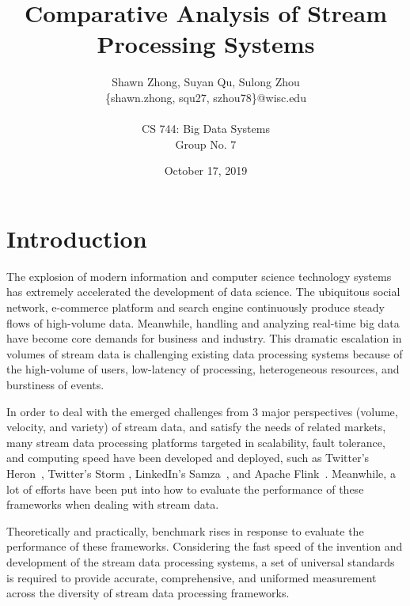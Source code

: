 \documentclass[pdftex,twocolumn,10pt,letterpaper]{article}
\begin{document}
\title{ Comparative Analysis of Stream Processing Systems }
\author{
    Shawn Zhong, Suyan Qu, Sulong Zhou \\
    \{shawn.zhong, squ27, szhou78\}@wisc.edu\\
    \\
    CS 744: Big Data Systems \\
    Group No. 7
}
\date{October 17, 2019}


\maketitle

\section{Introduction}
The explosion of modern information and computer science technology systems has extremely accelerated the development of data science. The ubiquitous social network, e-commerce platform and search engine continuously produce steady flows of high-volume data\cite{mcafee2012big}. Meanwhile, handling and analyzing real-time big data have become core demands for business and industry. This dramatic escalation in volumes of stream data is challenging existing data processing systems because of the high-volume of users, low-latency of processing, heterogeneous resources, and burstiness of events.  

In order to deal with the emerged challenges from 3 major perspectives (volume, velocity, and variety) of stream data\cite{birke2014big}, and satisfy the needs of related markets, many stream data processing platforms targeted in scalability, fault tolerance, and computing speed have been developed and deployed, such as Twitter’s Heron~\cite{Kulkarni:2015:THS:2723372.2742788}, Twitter's Storm \cite{toshniwal2014storm}, LinkedIn’s Samza~\cite{Noghabi:2017:SSS:3137765.3137770}, and Apache Flink~\cite{Carbone2015ApacheFS}. Meanwhile, a lot of efforts have been put into how to evaluate the performance of these frameworks when dealing with stream data. 

Theoretically and practically, benchmark rises in response to evaluate the performance of these frameworks. Considering the fast speed of the invention and development of the stream data processing systems, a set of universal standards is required to provide accurate, comprehensive, and uniformed measurement across the diversity of stream data processing frameworks. 
\end{document}
